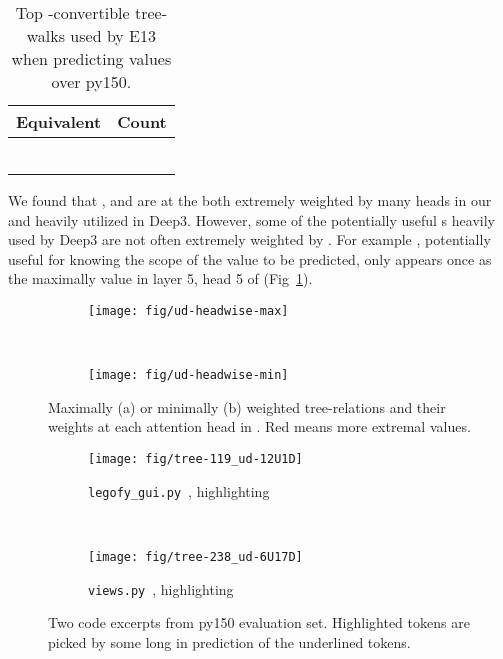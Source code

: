 \documentclass[nonacm, sigconf]{acmart}
\newcommand{\code}[1]{{\texttt{#1}}}
\newcommand{\figref}[1]{Fig~\ref{#1}}
\begin{document}
\begin{table}[]
    \centering
    \begin{tabular}{l | r}
    \hline
    Equivalent  & Count \\
    \hline
     &  \\
 &  \\
 &  \\
 &  \\
 &  \\
 &  \\
    \hline
    \end{tabular}
    \caption{Top -convertible tree-walks used by E13 when predicting values over py150.}
    \label{tab:top-eth-paths}
\end{table}

 
We found that ,  and  are at the both 
extremely weighted by many heads in our \TreeRel 
and heavily utilized in Deep3.
However, some of the potentially useful s heavily used by Deep3 are not often extremely weighted by \TreeRel.
For example , potentially useful for knowing the scope of the value to be predicted, only appears once as the maximally value in layer 5, head 5 of \TreeRel (\figref{fig:ud-headwise-max}).

\begin{figure*}
    \centering
    \begin{subfigure}[b]{0.35\textwidth}
        \texttt{[image: fig/ud-headwise-max]}
        \caption{}
        \label{fig:ud-headwise-max}
    \end{subfigure}
    ~ 
    \begin{subfigure}[b]{0.35\textwidth}
        \texttt{[image: fig/ud-headwise-min]}
        \caption{}
        \label{fig:ud-headwise-min}
    \end{subfigure}
    \caption{Maximally (a) or minimally (b) weighted tree-relations and their weights at each attention head in \TreeRel.
    \textcolor{ACMRed}{Red} means more extremal values.}
    \label{fig:ud-headwise}
\end{figure*}

\begin{figure*}
    \centering
    \begin{subfigure}[b]{0.45\textwidth}
        \texttt{[image: fig/tree-119\_ud-12U1D]}
        \caption{\code{legofy\_gui.py}~\protect\footnotemark, highlighting }
        \label{fig:long-ud-example-U12D1}
    \end{subfigure}
    ~ 
    \begin{subfigure}[b]{0.45\textwidth}
        \texttt{[image: fig/tree-238\_ud-6U17D]}
        \caption{\code{views.py}~\protect\footnotemark, highlighting }
        \label{fig:long-ud-example-U6D17}
    \end{subfigure}
    \caption{Two code excerpts from py150 evaluation set. Highlighted tokens are picked by some long  in prediction of the underlined tokens.
    }
    \label{fig:long-ud-example}
\end{figure*}
\addtocounter{footnote}{-2}
\end{document}
